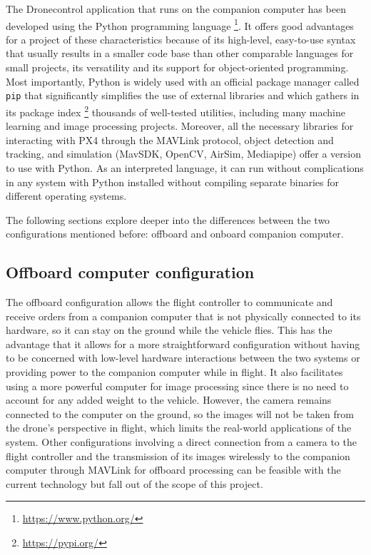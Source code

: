 The Dronecontrol application that runs on the companion computer has been developed using the Python programming language \footnote{\url{https://www.python.org/}}.
It offers good advantages for a project of these characteristics because of its high-level, easy-to-use syntax that usually results in a smaller code base than other comparable languages for small projects, its versatility and its support for object-oriented programming.
Most importantly, Python is widely used with an official package manager called \texttt{pip} that significantly simplifies the use of external libraries and which gathers in its package index \footnote{\url{https://pypi.org/}} thousands of well-tested utilities,
including many machine learning and image processing projects.
Moreover, all the necessary libraries for interacting with PX4 through the MAVLink protocol, object detection and tracking, and simulation (MavSDK, OpenCV, AirSim, Mediapipe) offer a version to use with Python.
As an interpreted language, it can run without complications in any system with Python installed without compiling separate binaries for different operating systems.

The following sections explore deeper into the differences between the two configurations mentioned before: offboard and onboard companion computer.

\subsection{Offboard computer configuration}
\label{subsec:offboard}

The offboard configuration allows the flight controller to communicate and receive orders from a companion computer that is not physically connected to its hardware, so it can stay on the ground while the vehicle flies.
This has the advantage that it allows for a more straightforward configuration without having to be concerned with low-level hardware interactions between the two systems or providing power to the companion computer while in flight.
It also facilitates using a more powerful computer for image processing since there is no need to account for any added weight to the vehicle.
However, the camera remains connected to the computer on the ground, so the images will not be taken from the drone's perspective in flight, which limits the real-world applications of the system.
Other configurations involving a direct connection from a camera to the flight controller and the transmission of its images wirelessly to the companion computer through MAVLink for offboard processing can be feasible with the current technology but fall out of the scope of this project.

